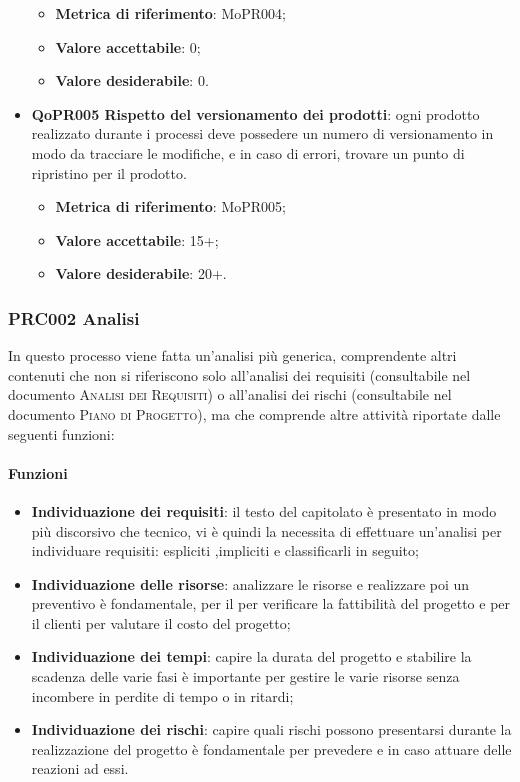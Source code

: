 \documentclass[../piano-di-qualifica.tex]{subfiles}
\begin{document}
\begin{itemize}
        \begin{itemize}
            \item \textbf{Metrica di riferimento}: MoPR004;
            \item \textbf{Valore accettabile}: 0; %
            \item \textbf{Valore desiderabile}: 0.
        \end{itemize}
    \item \textbf{QoPR005 Rispetto del versionamento dei prodotti}: ogni prodotto realizzato durante i processi deve possedere un numero di versionamento in modo da tracciare le modifiche, e in caso di errori, trovare un punto di ripristino per il prodotto.
        \begin{itemize}
            \item \textbf{Metrica di riferimento}: MoPR005;
            \item \textbf{Valore accettabile}: 15+; %
            \item \textbf{Valore desiderabile}: 20+.
        \end{itemize}
\end{itemize}

\subsubsection{PRC002 Analisi}
\label{sub:analisi}
In questo processo viene fatta un'analisi più generica, comprendente altri contenuti che non si riferiscono solo all'analisi dei requisiti (consultabile nel documento \textsc{Analisi dei Requisiti}) o all'analisi dei rischi (consultabile nel documento \textsc{Piano di Progetto}), ma che comprende altre attività riportate dalle seguenti funzioni:

\paragraph{Funzioni}
\label{sub:funzioni_2}
\begin{itemize}
    \item \textbf{Individuazione dei requisiti}: il testo del capitolato è presentato in modo più discorsivo che tecnico, vi è quindi la necessita di effettuare un'analisi per individuare requisiti: espliciti ,impliciti e classificarli in seguito;
    \item \textbf{Individuazione delle risorse}: analizzare le risorse e realizzare poi un preventivo è fondamentale, per il  per verificare la fattibilità del progetto e per il clienti per valutare il costo del progetto;
    \item \textbf{Individuazione dei tempi}: capire la durata del progetto e stabilire la scadenza delle varie fasi è importante per gestire le varie risorse senza incombere in perdite di tempo o in ritardi;
    \item \textbf{Individuazione dei rischi}: capire quali rischi possono presentarsi durante la realizzazione del progetto è fondamentale per prevedere e in caso attuare delle reazioni ad essi.
\end{itemize}
\end{document}
